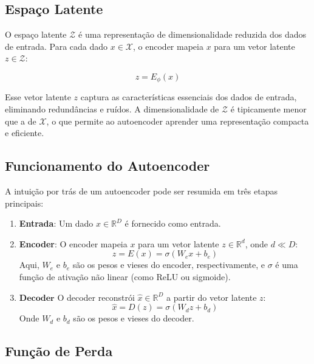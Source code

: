 \documentclass[a4paper]{tufte-handout}
\begin{document}
\subsection{Espaço Latente}

O espaço latente $\mathcal{Z}$ é uma representação de dimensionalidade reduzida dos dados de entrada. Para cada dado $x \in \mathcal{X}$, o encoder mapeia $x$ para um vetor 
latente $z \in \mathcal{Z}$:

\begin{equation*}
    z = E_{\phi}(x)
\end{equation*}

Esse vetor latente $z$ captura as características essenciais dos dados de entrada, eliminando redundâncias e ruídos.
 A dimensionalidade de $\mathcal{Z}$ é tipicamente menor que a de $\mathcal{X}$, o que permite ao autoencoder aprender uma representação compacta e eficiente.

\subsection{Funcionamento do Autoencoder}

A intuição por trás de um autoencoder pode ser resumida em três etapas principais:
\begin{enumerate}
    \item \textbf{Entrada}: Um dado $x \in \mathbb{R}^D$ é fornecido como entrada.
    \item \textbf{Encoder}: O encoder mapeia $x$ para um vetor latente $z \in \mathbb{R}^d$, onde $d \ll D$:
   \begin{equation*}
       z = E(x) = \sigma(W_e x + b_e)
   \end{equation*}
   Aqui, $W_e$ e $b_e$ são os pesos e vieses do encoder, respectivamente, e $\sigma$ é uma função de ativação não linear (como ReLU ou sigmoide).
   \item $\mathbf{Decoder}$ O decoder reconstrói $\hat{x} \in \mathbb{R}^D$ a partir do vetor latente $z$:
   \begin{equation*}
       \hat{x} = D(z) = \sigma(W_d z + b_d)
   \end{equation*}
   Onde $W_d$ e $b_d$ são os pesos e vieses do decoder.
\end{enumerate}

\subsection{Função de Perda}
\end{document}
